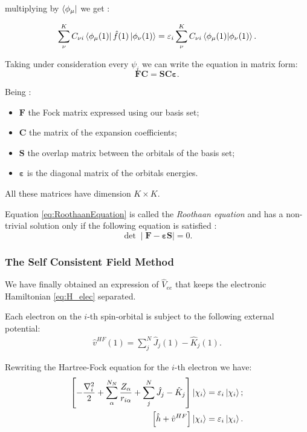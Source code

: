 \documentclass[a4paper,12pt]{article}
\begin{document}
multiplying by $\bra{\phi_{\mu}}$ we get :

\begin{equation}
	 \sum_{\nu}^{K} C_{\nu i} \bra{\phi_{\mu}(1)}\hat{f}(1)\ket{\phi_{\nu}(1)}  
	 = \varepsilon_i \sum_{\nu}^{K} C_{\nu i} \bra{\phi_{\mu}(1)}\ket{\phi_{\nu}(1)}.
\end{equation}

Taking under consideration every $\psi_i$ we can write the equation in matrix form:
\begin{equation}\label{eq:RoothaanEquation}
\boxed{
\mathbf{FC} = \mathbf{SC\varepsilon}
}.
\end{equation}

Being :
\begin{itemize}
	\item $\mathbf{F}$ the Fock matrix expressed using our basis set;
	\item $\mathbf{C}$ the matrix of the expansion coefficients;
	\item $\mathbf{S}$ the overlap matrix between the orbitals of the basis set;
	\item $\mathbf{\varepsilon}$ is the diagonal matrix of the orbitals energies.
\end{itemize}
All these matrices have dimension $K\times K$.

Equation \eqref{eq:RoothaanEquation} is called the \textit{Roothaan equation} and has a non-trivial solution only if the following  equation is satisfied \cite[p.309]{Atkins}:
\begin{equation}\label{eq:secular}
	\det \mid \mathbf{F - \varepsilon S} \mid =0.
\end{equation}


\subsubsection{The Self Consistent Field Method} \label{sec:SCF}



We have finally obtained an expression of $\hat{V}_{ee}$ that keeps the electronic Hamiltonian \eqref{eq:H_elec} separated.

Each electron on the $i$-th spin-orbital is subject to the following external potential:
\begin{align}
	\hat{v}^{HF}(1) = \sum_{j}^{N} \hat{J}_{j}(1) - \hat{K}_{j}(1).
\end{align}

Rewriting the Hartree-Fock equation for the $i$-th electron we have:
\begin{align}
	\left[- \frac{\nabla_{i}^{2}}{2} + \sum_{\alpha}^{N_{N}} \frac{Z_{\alpha}}{r_{i\alpha}} + \sum_{j}^{N} \hat{J}_{j} - \hat{K}_{j}  \right] \ket{\chi_i}  & = \varepsilon_i \ket{\chi_i}; \\
	\left[\hat{h} + \hat{v}^{HF}\right] \ket{\chi_i} & = \varepsilon_i \ket{\chi_i}.
\end{align}
\end{document}
